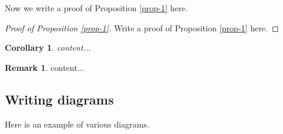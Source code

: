 \documentclass[11pt,a4paper,leqno]{article}
\numberwithin{equation}{subsection}
\newtheorem{corollary}[equation]{Corollary}
\theoremstyle{definition}
\newtheorem{remark}[equation]{Remark}
\begin{document}
Now we write a proof of Proposition \ref{prop-1} here. 
\begin{proof}[Proof of Proposition \ref{prop-1}]
	Write a proof of Proposition \ref{prop-1} here. 
\end{proof}

\begin{corollary}
	content...
\end{corollary}

\begin{remark}
	content...
\end{remark}


\subsection{Writing diagrams}
Here is an example of various diagrams. 
\end{document}
